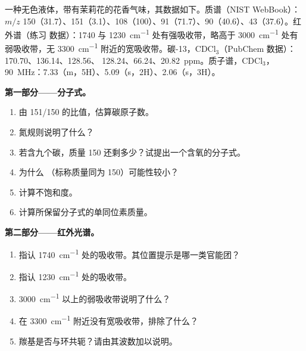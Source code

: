 \begin{problem}
\label{pb:b2:structure-determination:1}
一种无色液体，带有茉莉花的花香气味，其数据如下。质谱（NIST
WebBook）：$m/z$ 150（31.7）、151（3.1）、108（100）、91（71.7）、90（40.6）、43（37.6）。红外谱（练习
数据）：1740 与 \qty{1230}{cm^{-1}} 处有强吸收带，略高于 \qty{3000}{cm^{-1}} 处有弱吸收带，无
\qty{3300}{cm^{-1}} 附近的宽吸收带。碳-13，CDCl$_3$（PubChem 数据）：170.70、136.14、128.56、
128.24、66.24、20.82~ppm。质子谱，CDCl$_3$，\qty{90}{MHz}：7.33（m，5H）、5.09（s，2H）、2.06（s，3H）。

\begin{center}
\end{center}

\medskip
\noindent\textbf{第一部分——分子式。}
\begin{enumerate}
  \item 由 151/150 的比值，估算碳原子数。
  \item 氮规则说明了什么？
  \item 若含九个碳，质量 150 还剩多少？试提出一个含氧的分子式。
  \item 为什么 （标称质量同为 150）可能性较小？
  \item 计算不饱和度。
  \item 计算所保留分子式的单同位素质量。
\end{enumerate}

\medskip
\noindent\textbf{第二部分——红外光谱。}
\begin{enumerate}[resume]
  \item 指认 \qty{1740}{cm^{-1}} 处的吸收带。其位置提示是哪一类官能团？
  \item 指认 \qty{1230}{cm^{-1}} 处的吸收带。
  \item \qty{3000}{cm^{-1}} 以上的弱吸收带说明了什么？
  \item 在 \qty{3300}{cm^{-1}} 附近没有宽吸收带，排除了什么？
  \item 羰基是否与环共轭？请由其波数加以说明。
\end{enumerate}


\end{problem}
